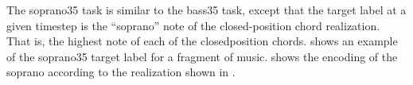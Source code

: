 
The \gls{soprano35} task is similar to the \gls{bass35}
task, except that the target label at a given timestep is
the ``soprano'' note of the \gls{closed-position} chord
realization. That is, the highest note of each of the
\gls{closedposition} chords.   shows an
example of the \gls{soprano35} target label for a fragment
of music.  shows the encoding of the
soprano according to the realization shown in
.

